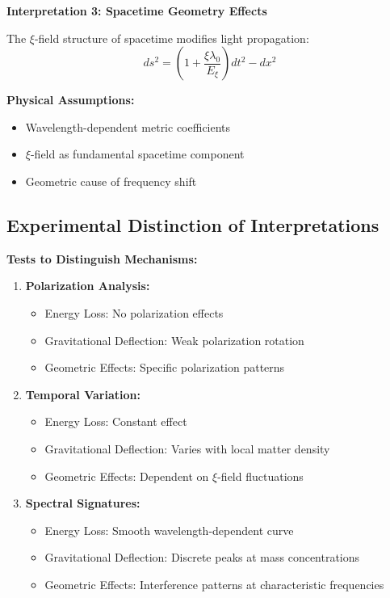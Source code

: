 \documentclass[12pt,a4paper]{article}
\newcommand{\xipar}{\xi}
\newcommand{\Exi}{E_\xi}
\begin{document}
	\begin{alternative}
		\textbf{Interpretation 3: Spacetime Geometry Effects}
		
		The $\xi$-field structure of spacetime modifies light propagation:
		\begin{equation}
			ds^2 = \left(1 + \frac{\xipar \lambda_0}{\Exi}\right) dt^2 - dx^2
		\end{equation}
		
		\textbf{Physical Assumptions:}
		\begin{itemize}
			\item Wavelength-dependent metric coefficients
			\item $\xi$-field as fundamental spacetime component
			\item Geometric cause of frequency shift
		\end{itemize}
	\end{alternative}
	
	\subsection{Experimental Distinction of Interpretations}
	
	\begin{experiment}
		\textbf{Tests to Distinguish Mechanisms:}
		
		\begin{enumerate}
			\item \textbf{Polarization Analysis:}
			\begin{itemize}
				\item Energy Loss: No polarization effects
				\item Gravitational Deflection: Weak polarization rotation
				\item Geometric Effects: Specific polarization patterns
			\end{itemize}
			
			\item \textbf{Temporal Variation:}
			\begin{itemize}
				\item Energy Loss: Constant effect
				\item Gravitational Deflection: Varies with local matter density
				\item Geometric Effects: Dependent on $\xi$-field fluctuations
			\end{itemize}
			
			\item \textbf{Spectral Signatures:}
			\begin{itemize}
				\item Energy Loss: Smooth wavelength-dependent curve
				\item Gravitational Deflection: Discrete peaks at mass concentrations
				\item Geometric Effects: Interference patterns at characteristic frequencies
			\end{itemize}
		\end{enumerate}
	\end{experiment}
	
\end{document}
